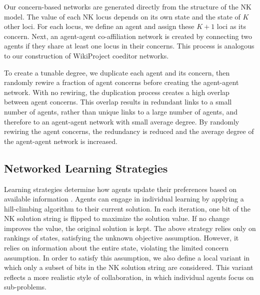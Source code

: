 \documentclass[letterpaper,twocolumn,10pt]{article}
\newcommand{\+}{\phantom{-}}
\begin{document}
Our concern-based networks are generated directly from the structure of the NK model.
The value of each NK locus depends on its own state and the state of $K$ other loci.
For each locus, we define an agent and assign these $K+1$ loci as its concern.
Next, an agent-agent co-affiliation network is created by connecting two agents if they share at least
one locus in their concerns.
This process is analogous to our construction of WikiProject coeditor networks.

To create a tunable degree, we duplicate each agent and its concern,
then randomly rewire a fraction of agent concerns before creating the agent-agent network.
With no rewiring, the duplication process creates a high overlap between agent concerns.
This overlap results in redundant links to a small number of agents,
rather than unique links to a large number of agents,
and therefore to an agent-agent network with small average degree.
By randomly rewiring the agent concerns, the redundancy is reduced
and the average degree of the agent-agent network is increased.

\subsection{Networked Learning Strategies}

Learning strategies determine how agents update their preferences based on
available information \cite{barkoczi_social_2016}.
Agents can engage in individual learning
by applying a hill-climbing algorithm to their current solution.
In each iteration, one bit of the NK solution string is flipped to maximize the solution value.
If no change improves the value, the original solution is kept.
The above strategy relies only on rankings of states,
satisfying the unknown objective assumption.
However, it relies on information about the entire state,
violating the limited concern assumption.
In order to satisfy this assumption,
we also define a local variant
in which only a subset of bits in the NK solution string are considered.
This variant reflects a more realistic style of collaboration,
in which individual agents focus on sub-problems.
\end{document}
